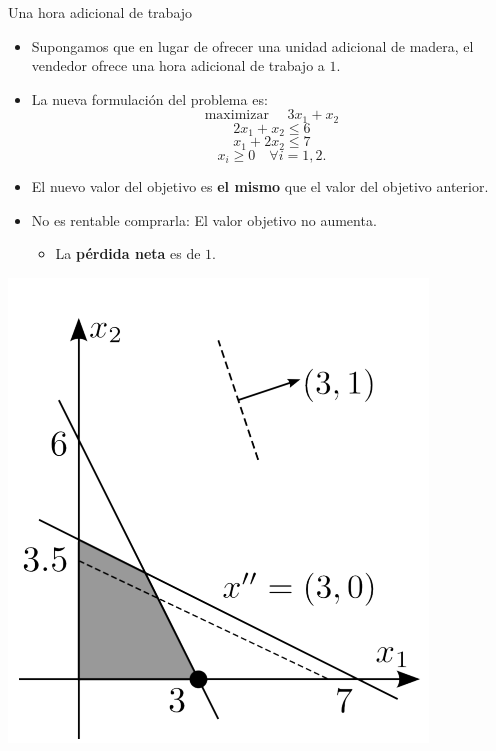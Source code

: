 \documentclass{beamer}
\begin{document}
\begin{frame}{Una hora adicional de trabajo}
\begin{multicols}{2}
    \begin{itemize}
        \item Supongamos que en lugar de ofrecer una unidad adicional de madera, el vendedor ofrece una hora adicional de trabajo a $1$.
    \end{itemize}

    \begin{itemize}
        \item La nueva formulación del problema es:
        \[
        \text{maximizar } \quad 3x_1 + x_2
        \]
        \[
        2x_1 + x_2 \leq 6
        \]
        \[
        x_1 + 2x_2 \leq 7
        \]
        \[
        x_i \geq 0 \quad \forall i = 1, 2.
        \]
    \end{itemize}

    \begin{itemize}
        \item El nuevo valor del objetivo es \textbf{el mismo} que el valor del objetivo anterior.
    \end{itemize}

    \begin{itemize}
        \item No es rentable comprarla: El valor objetivo no aumenta.
        \begin{itemize}
            \item La \textbf{pérdida neta} es de $1$.
        \end{itemize}
    \end{itemize}
    \begin{center}
        \includegraphics[scale=0.5]{images/shadows3.png}
    \end{center}
\end{multicols}
\end{frame}
\end{document}
